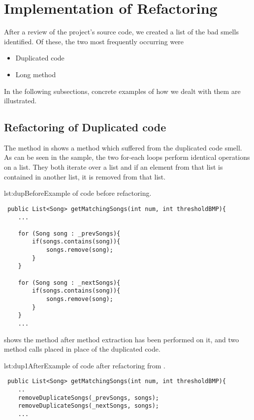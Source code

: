 \section{Implementation of Refactoring}
After a review of the project's source code, we created a list of the bad smells identified. Of these, the two most frequently occurring were
\begin{itemize}
\item Duplicated code
\item Long method
\end{itemize}

In the following subsections, concrete examples of how we dealt with them are illustrated. 
\subsection{Refactoring of Duplicated code}
The method in  shows a method which suffered from the duplicated code smell. As can be seen in the sample, the two for-each loops perform identical operations on a list. They both iterate over a list and if an element from that list is contained in another list, it is removed from that list.

\begin{code}{lst:dupBefore}{Example of code before refactoring.}
\begin{lstlisting}
 public List<Song> getMatchingSongs(int num, int thresholdBMP){
    ...

    for (Song song : _prevSongs){
        if(songs.contains(song)){
            songs.remove(song);
        }
    }

    for (Song song : _nextSongs){
        if(songs.contains(song)){
            songs.remove(song);
        }
    }
    ...
\end{lstlisting}
\end{code}

 shows the method after method extraction has been performed on it, and two method calls placed in place of the duplicated code.

\begin{code}{lst:dup1After}{Example of code after refactoring from .}
\begin{lstlisting}
 public List<Song> getMatchingSongs(int num, int thresholdBMP){
    ..
    removeDuplicateSongs(_prevSongs, songs);
    removeDuplicateSongs(_nextSongs, songs);
    ...
\end{lstlisting}
\end{code}

